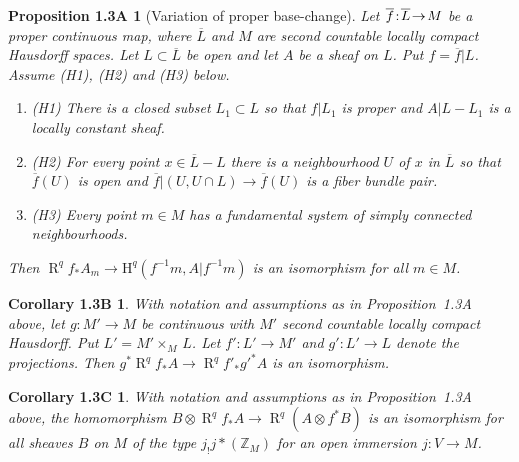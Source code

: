 \documentclass[10pt,twoside]{article}
\newtheorem{nprop}{Proposition 1.3A}
\newtheorem{ncor}{Corollary 1.3B}
\newtheorem{nncor}{Corollary 1.3C}
\newcommand{\Z}{{\mathbb {Z}}}
\newcommand{\homology}{{\mathrm {H}}}
\newcommand{\derived}{{\operatorname{R}}}
\begin{document}

\begin{nprop}[Variation of proper base-change]
Let $\overline{f}\!:\!\overline{L}\! \to\nolinebreak\! M$
be a proper continuous map, where $\overline{L}$ and $M$
are second countable locally compact Hausdorff spaces. Let
$L \subset  \overline{L}$ be open and let $A$ be a sheaf on $L$.
Put $f=\overline{f}|L$. Assume (H1), (H2) and (H3) below.
\begin {enumerate}
\item[{\rm (H1)}] There is a closed subset $L_1\subset L$ so that
$f|L_1$ is proper and $A|L-L_1$ is a locally constant sheaf.
\item[{\rm (H2)}] For every point $x \in  \overline{L}-L$ 
there is a neighbourhood  $U$ of $x$ in $\overline{L}$ so that 
$\overline{f}(U)$ is open and 
$\overline{f}|(U,U \cap L) \to \overline{f}(U)$ is a fiber
bundle pair.
\item[{\rm (H3)}] Every point $m \in M$ has a fundamental system of 
simply connected neighbourhoods.  
\end{enumerate}
Then $\derived^qf_*A_m \to \homology^q(f^{-1}m, A|f^{-1}m)$
is an isomorphism for all $m \in M$.
\end{nprop}


\begin{ncor} 
With notation and assumptions as in Proposition~1.3A \linebreak above, let
 $g:M' \to M$ be
continuous with $M'$ second countable locally compact Hausdorff. 
Put $L'=M' \times
_M\,L$. Let $f':L' \to M'$ and $g':L' \to L$ denote the projections.
Then
  $g^*\derived ^q f_* A \to \derived^q f'_* {g'}^*A$ 
is an isomorphism.
\end{ncor}

\begin{nncor}
With notation and assumptions as in Proposition~1.3A above, the
homomorphism $B \otimes \derived ^qf_*A \to 
\derived ^q (A \otimes f^*B)$ is an isomorphism for all
sheaves $B$ on $M$ of the type $j_!j*(\Z _M)$ 
for an open immersion $j:V \to M$. 
\end{nncor}
\end{document}

